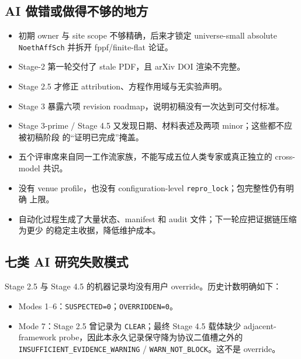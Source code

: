 \documentclass[12pt,a4paper]{article}
\providecommand{\tightlist}{\setlength{\itemsep}{0pt}\setlength{\parskip}{0pt}}
\begin{document}
\hypertarget{ai-ux505aux9519ux6216ux505aux5f97ux4e0dux591fux7684ux5730ux65b9}{%
\subsection{AI
做错或做得不够的地方}\label{ai-ux505aux9519ux6216ux505aux5f97ux4e0dux591fux7684ux5730ux65b9}}

\begin{itemize}
\tightlist
\item
  初期 owner 与 site scope 不够精确，后来才锁定 universe-small absolute
  \texttt{NoethAffSch} 并拆开 fppf/finite-flat 论证。
\item
  Stage-2 第一轮交付了 stale PDF，且 arXiv DOI 渲染不完整。
\item
  Stage 2.5 才修正 attribution、方程作用域与无实验声明。
\item
  Stage 3 暴露六项 revision roadmap，说明初稿没有一次达到可交付标准。
\item
  Stage 3-prime / Stage 4.5 又发现日期、材料表述及两项
  minor；这些都不应被初稿阶段 的``证明已完成''掩盖。
\item
  五个评审席来自同一工作流家族，不能写成五位人类专家或真正独立的
  cross-model 共识。
\item
  没有 venue profile，也没有 configuration-level
  \texttt{repro\_lock}；包完整性仍有明确 上限。
\item
  自动化过程生成了大量状态、manifest 和 audit
  文件；下一轮应把证据链压缩为更少 的稳定主收据，降低维护成本。
\end{itemize}

\hypertarget{ux4e03ux7c7b-ai-ux7814ux7a76ux5931ux8d25ux6a21ux5f0f}{%
\subsection{七类 AI
研究失败模式}\label{ux4e03ux7c7b-ai-ux7814ux7a76ux5931ux8d25ux6a21ux5f0f}}

Stage 2.5 与 Stage 4.5 的机器记录均没有用户 override。历史计数明确如下：

\begin{itemize}
\tightlist
\item
  Modes 1--6：\texttt{SUSPECTED=0}；\texttt{OVERRIDDEN=0}。
\item
  Mode 7：Stage 2.5 曾记录为 \texttt{CLEAR}；最终 Stage 4.5 载体缺少
  adjacent-framework probe，因此本永久记录保守降为协议二值槽之外的
  \texttt{INSUFFICIENT\_}\hspace{0pt}\texttt{EVIDENCE\_WARNING} /
  \texttt{WARN\_NOT\_BLOCK}。这不是 override。
\end{itemize}
\end{document}

